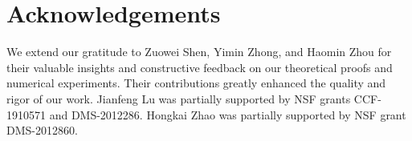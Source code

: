 \documentclass[nohyperref]{article}
\theoremstyle{plain}
\theoremstyle{definition}
\theoremstyle{remark}
\begin{document}



\ifdefined\isaccepted
\section*{Acknowledgements}

We extend our gratitude to Zuowei Shen, Yimin Zhong, and Haomin Zhou for their valuable insights and constructive feedback on our theoretical proofs and numerical experiments. Their contributions greatly enhanced the quality and rigor of our work.
Jianfeng Lu was partially supported by
NSF grants CCF-1910571 and DMS-2012286.
Hongkai Zhao was partially supported by NSF grant DMS-2012860.

\fi

%
\end{document}
